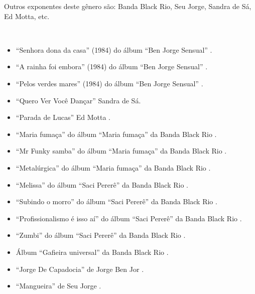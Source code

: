 \begin{description}
Outros exponentes deste gênero são: 
Banda Black Rio,
Seu Jorge,
Sandra de Sá,
Ed Motta,
etc.


\begin{example} ~

\begin{itemize}
\item ``Senhora dona da casa'' (1984) do álbum ``Ben Jorge Sensual'' \cite[pp. 195]{sanches2000tropicalismo}.
\item ``A rainha foi embora'' (1984) do álbum ``Ben Jorge Sensual'' \cite[pp. 195]{sanches2000tropicalismo}.
\item ``Pelos verdes mares'' (1984) do álbum ``Ben Jorge Sensual'' \cite[pp. 195]{sanches2000tropicalismo}.
\item ``Quero Ver Você Dançar'' Sandra de Sá.
\item ``Parada de Lucas'' Ed Motta \cite[pp. 11]{medeiros2012brazilian}.
\item ``Maria fumaça'' do álbum ``Maria fumaça'' da Banda Black Rio  \cite[pp. 11]{medeiros2012brazilian}.
\item ``Mr Funky samba'' do álbum ``Maria fumaça'' da Banda Black Rio  \cite[pp. 11]{medeiros2012brazilian}.
\item ``Metalúrgica'' do álbum ``Maria fumaça'' da Banda Black Rio  \cite[pp. 11]{medeiros2012brazilian}.
\item ``Melissa'' do álbum ``Saci Pererê'' da Banda Black Rio  \cite[pp. 11]{medeiros2012brazilian}.
\item ``Subindo o morro'' do álbum ``Saci Pererê'' da Banda Black Rio  \cite[pp. 11]{medeiros2012brazilian}.
\item ``Profissionalismo é isso aí'' do álbum ``Saci Pererê'' da Banda Black Rio  \cite[pp. 11]{medeiros2012brazilian}.
\item ``Zumbi'' do álbum ``Saci Pererê'' da Banda Black Rio  \cite[pp. 11]{medeiros2012brazilian}.
\item Álbum ``Gafieira universal'' da Banda Black Rio  \cite[pp. 11]{medeiros2012brazilian}.
\item ``Jorge De Capadocia'' de Jorge Ben Jor \cite[pp. 162]{sanches2000tropicalismo}.
\item ``Mangueira'' de Seu Jorge \cite[pp. 258]{2001raca}.
\end{itemize}
\end{example}

\end{description}
